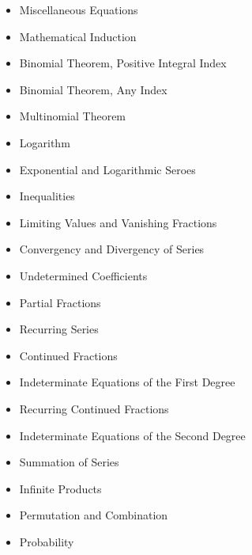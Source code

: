\documentclass[aspectratio=1610,8pt]{beamer}
\begin{document}
\begin{frame}
	\begin{itemize}
		\item Miscellaneous Equations
		\item Mathematical Induction
		\item Binomial Theorem, Positive Integral Index
		\item Binomial Theorem, Any Index
		\item Multinomial Theorem
		\item Logarithm
		\item Exponential and Logarithmic Seroes
		\item Inequalities
		\item Limiting Values and Vanishing Fractions
		\item Convergency and Divergency of Series
		\item Undetermined Coefficients
		\item Partial Fractions
		\item Recurring Series
		\item Continued Fractions
	\end{itemize}
\end{frame}
\begin{frame}
	\begin{itemize}
		\item Indeterminate Equations of the First Degree
		\item Recurring Continued Fractions
		\item Indeterminate Equations of the Second Degree
		\item Summation of Series
		\item Infinite Products
		\item Permutation and Combination
		\item Probability
	\end{itemize}
\end{frame}
\end{document}
